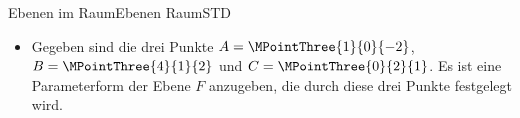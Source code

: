 \begin{MXContent}{Ebenen im Raum}{Ebenen Raum}{STD}
\begin{MExample}
\begin{itemize}
 (Diese Abbildung erscheint in Kürze.)
 
 Die oben angegebene Parameterform für $E$ ist nicht die einzig mögliche. Jeder andere Punkt in $E$ ist ebenfalls als Aufpunkt möglich. Zum Beispiel liegt der Punkt, welcher durch den Ortsvektor $\MVec{a}^\prime=\MVector{1\\1\\1}$ gegeben ist, in $E$, denn es gilt für $\lambda=\mu=1$:
 \[
  \MVector{1\\1\\1}=\MVector{0\\1\\0}+1\cdot\MVector{1\\0\\0}+1\cdot\MVector{0\\0\\1}\MDFPeriod
 \]
 Dieser kann als Aufpunktvektor verwendet werden. Als andere Richtungsvektoren können alle Vektoren verwendet werden, die zu $\MVec{u}$ und $\MVec{v}$ komplanar, zueinander aber nicht kollinear sind, zum Beispiel $\MVec{u}^\prime=\MVector{1\\0\\1}=1\cdot\MVector{1\\0\\0}+1\cdot\MVector{0\\0\\1}$ und $\MVec{v}^\prime=\MVector{1\\0\\-1}=1\cdot\MVector{1\\0\\0}-1\cdot\MVector{0\\0\\1}$. Dann ist eine weitere Darstellung von $E$ in Parameterform durch
 \[
  E\colon \MVec{r}=\MVec{a}^\prime+s\MVec{u}^\prime+t\MVec{v}^\prime=\MVector{1\\1\\1}+s\MVector{1\\0\\1}+t\MVector{1\\0\\-1}\MDFPSpace;\MDFPaSpace s,t\in\R
 \]
 möglich.
 \item Gegeben sind die drei Punkte $A=\MPointThree{1}{0}{-2}$, $B=\MPointThree{4}{1}{2}$ und $C=\MPointThree{0}{2}{1}$. Es ist eine Parameterform der Ebene $F$ anzugeben, die durch diese drei Punkte festgelegt wird.
 

\end{itemize}
\end{MExample}
\end{MXContent}
